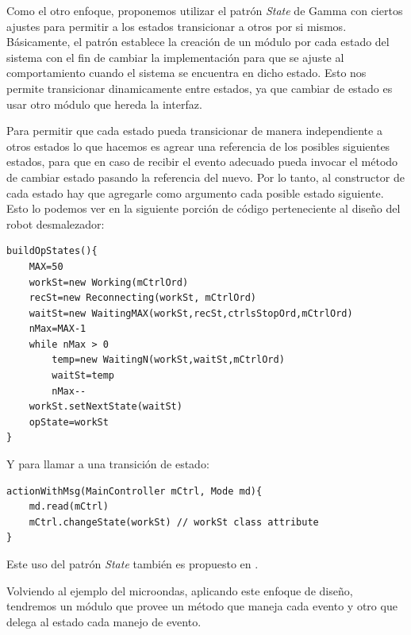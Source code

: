 Como el otro enfoque, proponemos utilizar el patrón \textit{State} de Gamma con ciertos ajustes para permitir a los estados transicionar a otros por si mismos. Básicamente, el patrón establece la creación de un módulo por cada estado del sistema con el fin de cambiar la implementación para que se ajuste al comportamiento cuando el sistema se encuentra en dicho estado. Esto nos permite transicionar dinamicamente entre estados, ya que cambiar de estado es usar otro módulo que hereda la interfaz.

Para permitir que cada estado pueda transicionar de manera independiente a otros estados lo que hacemos es agrear una referencia de los posibles siguientes estados, para que en caso de recibir el evento adecuado pueda invocar el método de cambiar estado pasando la referencia del nuevo. Por lo tanto, al constructor de cada estado hay que agregarle como argumento cada posible estado siguiente. Esto lo podemos ver en la siguiente porción de código perteneciente al diseño del robot desmalezador:

\begin{lstlisting}
buildOpStates(){
    MAX=50
    workSt=new Working(mCtrlOrd)
    recSt=new Reconnecting(workSt, mCtrlOrd)
    waitSt=new WaitingMAX(workSt,recSt,ctrlsStopOrd,mCtrlOrd)
    nMax=MAX-1
    while nMax > 0
        temp=new WaitingN(workSt,waitSt,mCtrlOrd)
        waitSt=temp
        nMax--
    workSt.setNextState(waitSt)
    opState=workSt
}
\end{lstlisting}

Y para llamar a una transición de estado:
\begin{lstlisting}
actionWithMsg(MainController mCtrl, Mode md){
    md.read(mCtrl)
    mCtrl.changeState(workSt) // workSt class attribute
}
\end{lstlisting}

Este uso del patrón \textit{State} también es propuesto en \cite[\textit{Chapter 10 : Finite State Machine Patterns Part III: New Patterns as Design Components}]{douglass}.


Volviendo al ejemplo del microondas, aplicando este enfoque de diseño, tendremos un módulo que provee un método que maneja cada evento y otro que delega al estado cada manejo de evento.

